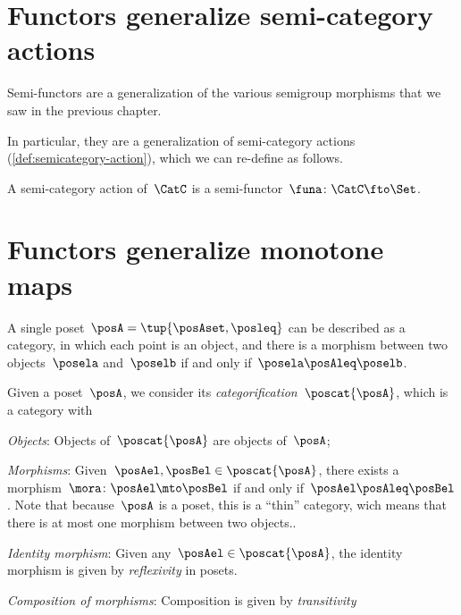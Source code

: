 
\section[\dots as semi-category actions]{Functors generalize semi-category actions}


Semi-functors are a generalization of the various semigroup morphisms that we saw in the previous chapter.


In particular, they are a generalization of semi-category actions (\cref{def:semicategory-action}), which we can re-define as follows.

\begin{ctdefinition}
	A semi-category action of~$\CatC$ is a semi-functor~$\funa\colon \CatC \fto \Set$.
\end{ctdefinition}

\section[\dots as monotone maps]{Functors generalize monotone maps}
\label{sec:posetsarecats}

A single poset~$\posA=\tup{\posAset, \posleq}$ can be described as a category, in which each point is an object, and there is a morphism between two objects~$\posela$ and~$\poselb$ if and only if~$\posela \posAleq \poselb$.

\begin{ctdefinition}
	Given a poset~$\posA$, we consider its \emph{categorification}~$\poscat{\posA}$, which is a category with
	\begin{compactenum}
		\item \emph{Objects}: Objects of~$\poscat{\posA}$ are objects of~$\posA$;
		\item \emph{Morphisms}: Given~$\posAel,\posBel\in \poscat{\posA}$, there exists a morphism~$\mora\colon \posAel\mto \posBel$ if and only if~$\posAel \posAleq \posBel$.
		Note that because~$\posA$ is a poset, this is a ``thin'' category, wich means that there is at most one morphism between two objects..
		\item \emph{Identity morphism}: Given any~$\posAel \in \poscat{\posA}$, the identity morphism is given by \emph{reflexivity} in posets.
		\item \emph{Composition of morphisms}: Composition is given by \emph{transitivity}
	\end{compactenum}
\end{ctdefinition}

